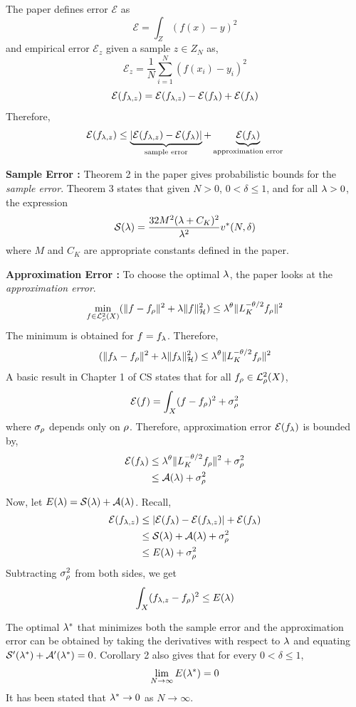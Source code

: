 \begin{itemize}
The paper defines error $\mathcal{E}$ as 
\[
\mathcal{E} = \int_Z (f(x) - y)^2
\]
and empirical error $\mathcal{E}_z$ given a sample $z \in Z_N$ as,
\[
\mathcal{E}_z = \frac{1}{N} \sum_{i=1}^N (f(x_i) - y_i)^2
\]
\[
\mathcal{E}(f_{\lambda,z}) = \mathcal{E}(f_{\lambda, z }) - \mathcal{E}(f_\lambda) + \mathcal{E}(f_\lambda)
\]
Therefore, 
\[
\mathcal{E}(f_{\lambda,z}) \leq \underbrace{|\mathcal{E}(f_{\lambda,z}) - \mathcal{E}(f_\lambda)|}_{\text{sample error}} + \underbrace{\mathcal{E}(f_\lambda)}_{\text{approximation error}}
\]

\noindent \textbf{Sample Error :}
Theorem 2 in the paper gives probabilistic bounds for the \textit{sample error}.
Theorem 3 states that given $N>0$, $0<\delta \leq 1$, and for all $\lambda>0$, the expression 
\[
\mathcal{S}(\lambda) = \frac{32 M^2 (\lambda + C_K)^2}{\lambda^2} v^*(N,\delta)
\]
where $M$ and $C_K$ are appropriate constants defined in the paper. 

\noindent \textbf{Approximation Error :} To choose the optimal $\lambda$, the paper looks at the \textit{approximation error}. 
\[
\min_{f \in \mathcal{L}_\rho^2(X)} (\|f - f_\rho\|^2 + \lambda \|f\|^2_{\cal H}) \leq \lambda^\theta \|L_K^{-\theta/2} f_\rho \|^2
\]
The minimum is obtained for $f = f_\lambda$. Therefore,
\[
(\|f_\lambda - f_\rho\|^2 + \lambda \|f_\lambda\|^2_{\cal H}) \leq \lambda^\theta \|L_K^{-\theta/2} f_\rho \|^2
\]
A basic result in Chapter 1 of CS states that for all $f_\rho \in \mathcal{L}_\rho^2(X)$, 
\[
\mathcal{E}(f) = \int_X (f - f_\rho)^2 + \sigma_\rho^2
\]
where $\sigma_\rho$ depends only on $\rho$. Therefore, approximation error $\mathcal{E}(f_\lambda)$ is bounded by,
\[
\begin{aligned}
\mathcal{E}(f_\lambda)  & \leq \lambda^\theta \|L_K^{-\theta/2} f_\rho \|^2 + \sigma_\rho^2\\
& \leq \mathcal{A}(\lambda) + \sigma_\rho^2 
\end{aligned}
\]

Now, let $E(\lambda) = \mathcal{S}(\lambda) + \mathcal{A}(\lambda)$. 
Recall,
\[
\begin{aligned}
\mathcal{E}(f_{\lambda,z}) &\leq |\mathcal{E}(f_\lambda) - \mathcal{E}(f_{\lambda,z})| + \mathcal{E}(f_\lambda) \\
& \leq \mathcal{S}(\lambda) + \mathcal{A}(\lambda) + \sigma_\rho^2\\
& \leq E(\lambda) + \sigma_\rho^2
\end{aligned}
\]
Subtracting $\sigma_\rho^2$ from both sides, we get
\[
\int_X (f_{\lambda,z} - f_\rho)^2 \leq E(\lambda)
\]

The optimal $\lambda^*$ that minimizes both the sample error and the approximation error can be obtained by taking the derivatives with respect to $\lambda$ and equating $\mathcal{S}'(\lambda^*) + \mathcal{A}'(\lambda^*) =0$. Corollary 2 also gives that for every $0 <\delta \leq 1$, 
\[
\lim_{N \to \infty} E(\lambda^*) = 0 
\]
It has been stated that $\lambda^* \to 0$ as $N \to \infty$.


\end{itemize}
